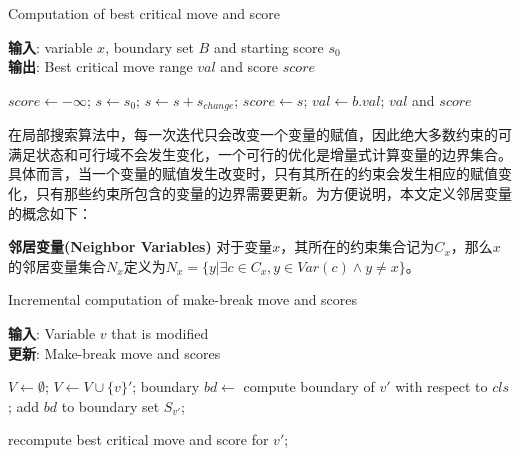\begin{algorithm}[t]
    \caption{Computation of best critical move and score}
    \label{alg:score}
    \textbf{输入}: variable $x$, boundary set $B$ and starting score $s_0$\\
    \textbf{输出}: Best critical move range $val$ and score $score$
    \begin{algorithmic}[1] %
        \Statex \hrulefill

        \State $score \leftarrow -\infty$;
        \State $s \leftarrow s_0$;
            \STATE $s \leftarrow s + s_{change}$;
                \STATE $score \leftarrow s$;
                \STATE $val \leftarrow b.val$;
            \ENDIF
        \ENDFOR
        \RETURN $val$ and $score$
    \end{algorithmic}
\end{algorithm}

在局部搜索算法中，每一次迭代只会改变一个变量的赋值，因此绝大多数约束的可满足状态和可行域不会发生变化，一个可行的优化是增量式计算变量的边界集合。具体而言，当一个变量的赋值发生改变时，只有其所在的约束会发生相应的赋值变化，只有那些约束所包含的变量的边界需要更新。为方便说明，本文定义邻居变量的概念如下：

\begin{definition}{\textbf{邻居变量(Neighbor Variables)}}
    对于变量$x$，其所在的约束集合记为$C_x$，那么$x$的邻居变量集合$N_x$定义为$N_x = \{y | \exists c \in C_x, y \in Var(c) \land y \neq x\}$。
\end{definition}

\begin{algorithm}[t]
    \caption{Incremental computation of make-break move and scores}
    \label{alg:update}
    \textbf{输入}: Variable $v$ that is modified\\
    \textbf{更新}: Make-break move and scores
    \begin{algorithmic}[1] %
        \Statex \hrulefill

        \State $V \leftarrow \emptyset$;
                \STATE $V \leftarrow V \cup \{v\}'$;
                \STATE boundary $bd \leftarrow $ compute boundary of $v'$ with respect to  $cls$;
                \STATE add $bd$ to boundary set $S_{v'}$;   
            \ENDFOR
        \ENDFOR

            \STATE recompute best critical move and score for $v'$; 
        \ENDFOR
    \end{algorithmic}
\end{algorithm}


